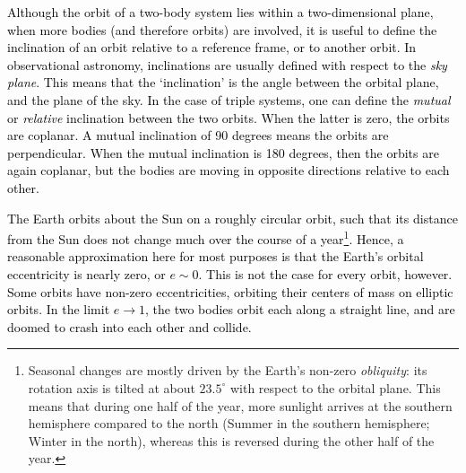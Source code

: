 \documentclass[main.tex]{subfiles}
\begin{document}
\begin{tcolorbox}[sharp corners, colback=red!30, colframe=red!80!blue, title=Box \refstepcounter{educhap3}\label{boxchap3:incl}\ref{boxchap3:incl} -- Orbital Inclination]
\par \textcolor{black}{ Although the orbit of a two-body system lies within a two-dimensional plane, when more bodies (and therefore orbits) are involved, it is useful to define the inclination of an orbit relative to a reference frame, or to another orbit. In observational astronomy, inclinations are usually defined with respect to the {\it sky plane}. This means that the `inclination' is the angle between the orbital plane, and the plane of the sky. In the case of triple systems, one can define the {\it mutual} or {\it relative} inclination between the two orbits. When the latter is zero, the orbits are coplanar. A mutual inclination of 90 degrees means the orbits are perpendicular. When the mutual inclination is 180 degrees, then the orbits are again coplanar, but the bodies are moving in opposite directions relative to each other. }  
\end{tcolorbox}



\begin{tcolorbox}[sharp corners, colback=red!30, colframe=red!80!blue, title=Box \refstepcounter{educhap3}\label{boxchap3:ecc}\ref{boxchap3:ecc} -- Orbital Eccentricity]
\par \textcolor{black}{The Earth orbits about the Sun on a roughly circular orbit, such that its distance from the Sun does not change much over the course of a year\footnote{Seasonal changes are mostly driven by the Earth's non-zero {\it obliquity}: its rotation axis is tilted at about $23.5^\circ$ with respect to the orbital plane. This means that during one half of the year, more sunlight arrives at the southern hemisphere compared to the north (Summer in the southern hemisphere; Winter in the north), whereas this is reversed during the other half of the year. }. Hence, a reasonable approximation here for most purposes is that the Earth's orbital eccentricity is nearly zero, or $e \sim 0$.  This is not the case for every orbit, however.  Some orbits have non-zero eccentricities, orbiting their centers of mass on elliptic orbits.  In the limit $e \rightarrow 1$, the two bodies orbit each along a straight line, and are doomed to crash into each other and collide.}
\end{tcolorbox}
\end{document}
